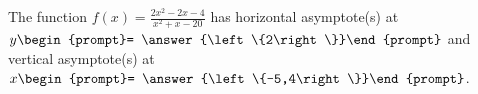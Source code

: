\documentclass{ximera}
\author{Gregory Hartman \and Matthew Carr}
\begin{document}
\begin{exercise}





The function $f(x)=\frac{2x^2-2x-4}{x^2+x-20}$ has horizontal asymptote(s) at $y\begin{prompt}= \answer{\left\{2\right\}}\end{prompt}$ and vertical asymptote(s) at $x\begin{prompt}= \answer{\left\{-5,4\right\}}\end{prompt}$.

\end{exercise}
\end{document}
